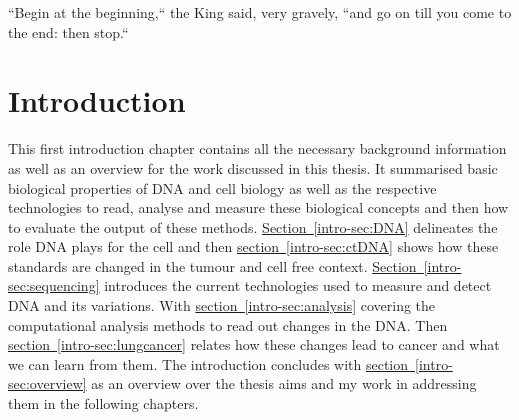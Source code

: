 
\begin{savequote}[85mm]
``Begin at the beginning,`` the King said, very gravely, ``and go on till you come to the end: then stop.``
\end{savequote}

\chapter{Introduction}
\label{ch:intro}



This first introduction chapter contains all the necessary background information as well as an overview for the work discussed in this thesis. It summarised basic biological properties of DNA and cell biology as well as the respective technologies to read, analyse and measure these biological concepts and then how to evaluate the output of these methods.
\hyperref[intro-sec:DNA]{Section~\ref*{intro-sec:DNA}} delineates the role DNA plays for the cell and then \hyperref[intro-sec:ctDNA]{section~\ref{intro-sec:ctDNA}} shows how these standards are changed in the tumour and cell free context. \hyperref[intro-sec:sequencing]{Section~\ref{intro-sec:sequencing}} introduces the current technologies used to measure and detect DNA and its variations. With \hyperref[intro-sec:analysis]{section~\ref*{intro-sec:analysis}} covering the computational analysis methods to read out changes in the DNA. Then \hyperref[intro-sec:lungcancer]{section~\ref{intro-sec:lungcancer}} relates how these changes lead to cancer and what we can learn from them. 
The introduction concludes with \hyperref[intro-sec:overview]{section~\ref*{intro-sec:overview}} as an overview over the thesis aims and my work in addressing them in the following chapters.















